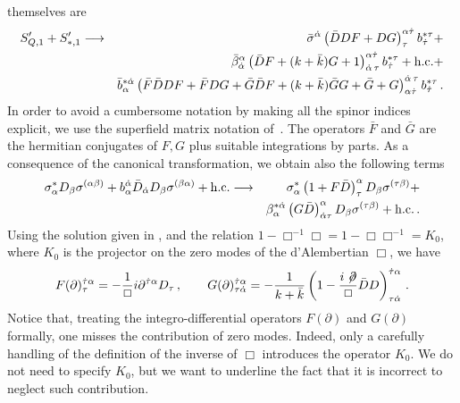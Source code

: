 \documentclass[a4paper,12pt]{article}
\begin{document}
themselves are
\begin{eqnarray} \label{level1_cano1}
S'_{Q,1} + S'_{*,1} \longrightarrow 
&& \bar \sigma^{\dot \alpha} \left( \bar D D  F + D G \right)^{\alpha
  \dot \tau}_{\tau}  
b^{*\tau}_{\dot \tau} + \nonumber \\ 
&& \bar \beta^{\alpha}_{\dot \alpha} 
\left( \bar DF + (k + \bar k) G + 1\right)_{\dot  \alpha \,
  \tau}^{\alpha \dot  \tau} b^{*\tau}_{\dot \tau}  
+ {\rm h.c.} + \\
&& \bar b^{*\dot \alpha}_{\alpha} \left(  \bar F \bar D D F + \bar F D G + 
\bar G \bar D F + (k + \bar k) \bar G G + 
\bar G + G \right)^{\dot  \alpha \, \tau}_{\alpha \dot  \tau}
b^{*\tau}_{\dot \tau}\,. \nonumber  
\end{eqnarray}
In order to avoid a cumbersome notation by making all the spinor
indices explicit, we use the superfield matrix notation
of~\cite{superspace}. The operators $\bar F$ and $\bar G$ are the
hermitian conjugates of $F,G$ plus suitable integrations by parts.  As
a consequence of the canonical transformation, we obtain also the
following terms
\begin{eqnarray}\label{level1_cano2}
  \sigma_{\alpha}^* D_\beta \sigma^{(\alpha \beta)} +  b_\alpha^{\dot \alpha}
\bar D_{\dot \alpha} D_\beta
 \sigma^{(\beta\alpha)} + {\rm h.c.} \longrightarrow 
&& \sigma_{\alpha}^* \left( 1 + F \bar D \right)^{\alpha}_\tau D_\beta 
\sigma^{(\tau \beta)} + \nonumber \\
&& \beta_\alpha^{*\dot \alpha} \left( G \bar D
\right)^\alpha_{\dot \alpha \tau}   
D_\beta \sigma^{(\tau \beta)} + {\rm h.c.}\,.
\end{eqnarray}
Using the solution given in \cite{GPZ}, 
and the relation $1 - \Box^{-1} \Box = 1 - \Box  \Box ^{-1} = K_0$, 
where $K_0$ is the projector on the zero modes of the d'Alembertian
$\Box$, we have  
\begin{eqnarray}
  \label{solu_1}
  F(\partial)^{\dot \tau \alpha}_{\tau} = - {1\over \Box}
  i \partial^{\dot \tau \alpha}  
  D_{\tau}\,,~~~~~~ G(\partial)^{\dot \tau \alpha}_{\tau \dot \alpha} = 
  - \frac{1}{k + \bar k} 
\left( 1 - \frac{i \not\!{\partial}}{\Box} \bar D D \right)^{\dot \tau
  \alpha}_{\tau 
  \dot \alpha}\,. 
\end{eqnarray}
Notice that, treating the integro-differential operators $F(\partial)$
and $G(\partial)$ formally, one misses the contribution of zero modes.
Indeed, only a carefully handling of the definition of the inverse of
$\Box$ introduces the operator $K_0$. We do not need to specify
$K_0$, but we want to underline the fact that it is incorrect to
neglect such contribution.
\end{document}
